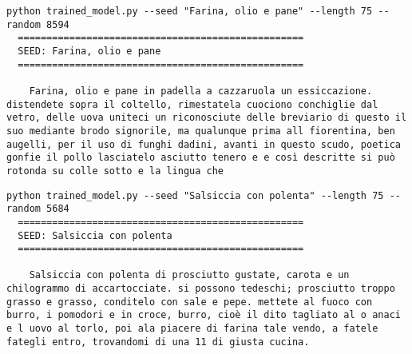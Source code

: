 \documentclass[a4paper,11pt]{article}
\begin{document}
\begin{lstlisting}[caption={\emph{SEED}: Farina, olio e pane, \emph{RNG seed}: 8594}]
  python trained_model.py --seed "Farina, olio e pane" --length 75 --random 8594
  ==================================================
  SEED: Farina, olio e pane
  ==================================================

    Farina, olio e pane in padella a cazzaruola un essiccazione. distendete sopra il coltello, rimestatela cuociono conchiglie dal vetro, delle uova uniteci un riconosciute delle breviario di questo il suo mediante brodo signorile, ma qualunque prima all fiorentina, ben augelli, per il uso di funghi dadini, avanti in questo scudo, poetica gonfie il pollo lasciatelo asciutto tenero e e così descritte si può rotonda su colle sotto e la lingua che
\end{lstlisting}

\begin{lstlisting}[caption={\emph{SEED}: Salsiccia con polenta, \emph{RNG seed}: 5684}]
  python trained_model.py --seed "Salsiccia con polenta" --length 75 --random 5684
  ==================================================
  SEED: Salsiccia con polenta
  ==================================================

    Salsiccia con polenta di prosciutto gustate, carota e un chilogrammo di accartocciate. si possono tedeschi; prosciutto troppo grasso e grasso, conditelo con sale e pepe. mettete al fuoco con burro, i pomodori e in croce, burro, cioè il dito tagliato al o anaci e l uovo al torlo, poi ala piacere di farina tale vendo, a fatele fategli entro, trovandomi di una 11 di giusta cucina.
\end{lstlisting}
\end{document}
